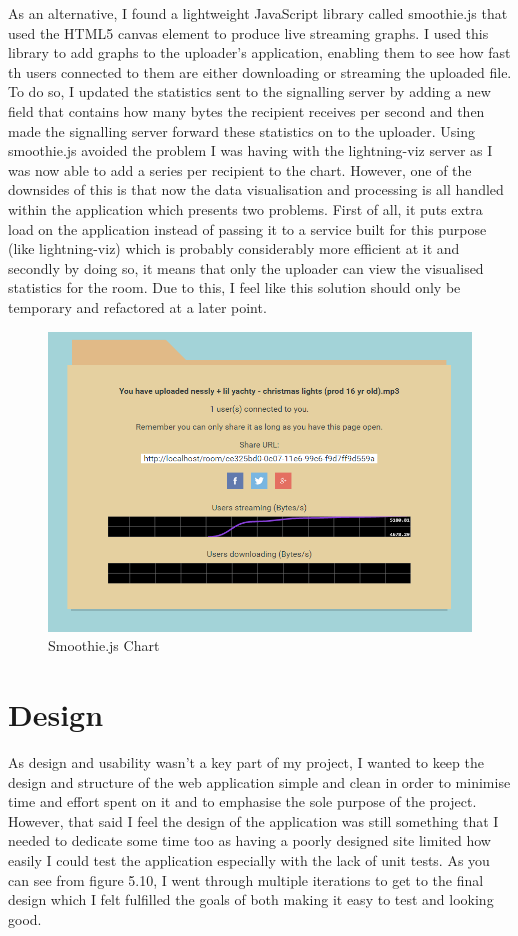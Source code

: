 \documentclass[]{report}
\begin{document}
				As an alternative, I found a lightweight JavaScript library called smoothie.js that used the HTML5 canvas element to produce live streaming graphs. I used this library to add graphs to the uploader's application, enabling them to see how fast th users connected to them are either downloading or streaming the uploaded file. To do so, I updated the statistics sent to the signalling server by adding a new field that contains how many bytes the recipient receives per second and then made the signalling server forward these statistics on to the uploader. Using smoothie.js avoided the problem I was having with the lightning-viz server as I was now able to add a series per recipient to the chart. However, one of the downsides of this is that now the data visualisation and processing is all handled within the application which presents two problems. First of all, it puts extra load on the application instead of passing it to a service built for this purpose (like lightning-viz) which is probably considerably more efficient at it and secondly by doing so, it means that only the uploader can view the visualised statistics for the room. Due to this, I feel like this solution should only be temporary and refactored at a later point.
				
				\begin{figure}[H]
					\caption{Smoothie.js Chart}
					\centering
					\includegraphics[scale=0.5]{smoothie-js.png}
				\end{figure}
				
		\section{Design}			
			As design and usability wasn't a key part of my project, I wanted to keep the design and structure of the web application simple and clean in order to minimise time and effort spent on it and to emphasise the sole purpose of the project. However, that said I feel the design of the application was still something that I needed to dedicate some time too as having a poorly designed site limited how easily I could test the application especially with the lack of unit tests. As you can see from figure 5.10, I went through multiple iterations to get to the final design which I felt fulfilled the goals of both making it easy to test and looking good.
	
\end{document}
